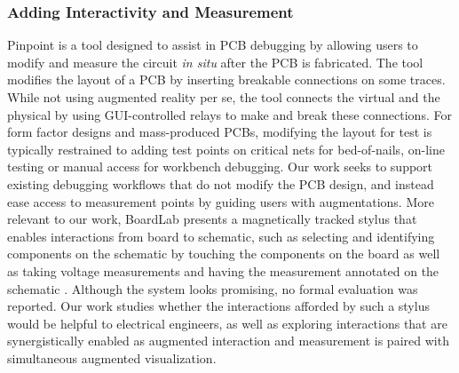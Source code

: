 \documentclass [11pt, proquest] {uwthesis}[2020/02/24]
\begin{document}
\subsubsection{Adding Interactivity and Measurement}
Pinpoint \cite{Strasnick2019Pinpoint} is a tool designed to assist in PCB debugging by allowing users to modify and measure the circuit \textit{in situ} after the PCB is fabricated. The tool modifies the layout of a PCB by inserting breakable connections on some traces. While not using augmented reality per se, the tool connects the virtual and the physical by using GUI-controlled relays to make and break these connections. For form factor designs and mass-produced PCBs, modifying the layout for test is typically restrained to adding test points on critical nets for bed-of-nails, on-line testing or manual access for workbench debugging. Our work seeks to support existing debugging workflows that do not modify the PCB design, and instead ease access to measurement points by guiding users with augmentations.
More relevant to our work, BoardLab presents a magnetically tracked stylus that enables interactions from board to schematic, such as selecting and identifying components on the schematic by touching the components on the board as well as taking voltage measurements and having the measurement annotated on the schematic \cite{Goyal2013BoardLab}.
Although the system looks promising, no formal evaluation was reported.
Our work studies whether the interactions afforded by such a stylus would be helpful to electrical engineers, as well as exploring interactions that are synergistically enabled as augmented interaction and measurement is paired with simultaneous augmented visualization.
\end{document}
